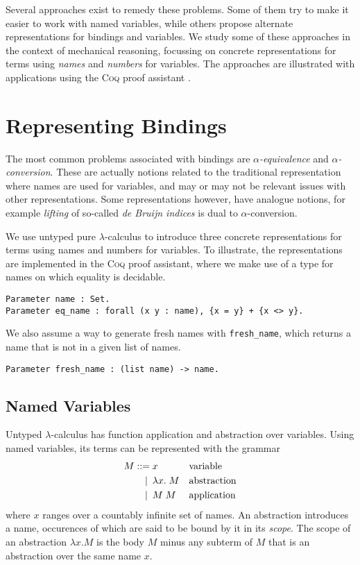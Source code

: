 \documentclass[a4paper,11pt]{article}
\newcommand{\name}[1]{\textsc{#1}\xspace}
\def\Coq{\name{Coq}}
\begin{document}
Several approaches exist to remedy these problems.
Some of them try to make it easier to work with named variables, while
others propose alternate representations for bindings and variables.
We study some of these approaches in the context of mechanical
reasoning, focussing on concrete representations for terms using
{\em names} and {\em numbers} for variables.
The approaches are illustrated with applications using the \Coq proof
assistant \cite{coq-refman-09,bertot-casteran-04}.


\section{Representing Bindings}\label{sec:representing}

The most common problems associated with bindings are {\em $\alpha$-equivalence}
and {\em $\alpha$-conversion}.
These are actually notions related to the traditional representation where
names are used for variables, and may or may not be relevant issues with
other representations.
Some representations however, have analogue notions, for example {\em lifting}
of so-called {\em de Bruijn indices} is dual to $\alpha$-conversion.

We use untyped pure $\lambda$-calculus \cite{barendregt-84} to introduce
three concrete representations for terms using names and numbers for
variables. To illustrate, the representations are implemented in the
\Coq proof assistant, where we make use of a type for names on which
equality is decidable.
\begin{lstlisting}
Parameter name : Set.
Parameter eq_name : forall (x y : name), {x = y} + {x <> y}.
\end{lstlisting}
We also assume a way to generate fresh names with \lstinline{fresh_name},
which returns a name that is not in a given list of names.
\begin{lstlisting}
Parameter fresh_name : (list name) -> name.
\end{lstlisting}


\subsection{Named Variables}

Untyped $\lambda$-calculus has function application and abstraction over
variables. Using named variables, its terms can be represented with the
grammar
\begin{align*}
  M ::=             &\; x
  && \text{variable} \\
  \llap{\textbar\:} &\; \lambda x. \; M
  && \text{abstraction} \\
  \llap{\textbar\:} &\; M \; M
  && \text{application}
\end{align*}
where $x$ ranges over a countably infinite set of names.
An abstraction introduces a name, occurences of which are said to be
bound by it in its {\em scope}. The scope of an abstraction $\lambda
x.M$ is the body $M$ minus any subterm of $M$ that is an abstraction
over the same name $x$.
\end{document}
